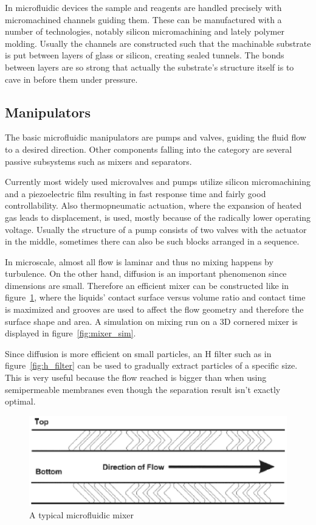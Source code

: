 \documentclass[12pt]{article}
\begin{document}
In microfluidic devices the sample and reagents are handled precisely with micromachined 
channels guiding them. These can be manufactured with a number of technologies, notably 
silicon micromachining and lately polymer molding. Usually the channels are constructed such that 
the machinable substrate is put between layers of glass or silicon, creating sealed tunnels.
The bonds between layers are so strong that actually the substrate's structure itself 
is to cave in before them under pressure.

\subsection{Manipulators}
The basic microfluidic manipulators are pumps and valves, guiding the fluid flow to a desired 
direction. Other components falling into the category are several passive subsystems such as
mixers and separators.

Currently most widely used microvalves and pumps utilize silicon micromachining and a 
piezoelectric film resulting in fast response time and fairly good controllability. Also 
thermopneumatic actuation, where the expansion of heated gas leads to displacement, is 
used, mostly because of the radically lower operating voltage. Usually the structure of a pump 
consists of two valves with the actuator in the middle, sometimes there can also be such 
blocks arranged in a sequence.

In microscale, almost all flow is laminar and thus no mixing happens by turbulence. On the other 
hand, diffusion is an important phenomenon since dimensions are small. Therefore an efficient 
mixer can be constructed like in figure~\ref{fig:mixer}, where the liquids' contact surface 
versus volume ratio and contact time is maximized and grooves are used to affect the flow geometry and therefore the surface shape and area. A simulation on mixing run on a 3D cornered 
mixer is displayed in figure~\ref{fig:mixer_sim}.

Since diffusion is more efficient on 
small particles, an H filter such as in figure~\ref{fig:h_filter} can be used to gradually
extract particles of a specific size. This is very useful because the flow reached is bigger
than when using semipermeable membranes even though the separation result isn't exactly optimal.

\begin{figure}[htcb]
\begin{center}
	\includegraphics{mixer2.eps}
	\caption{A typical microfluidic mixer \cite{HOWELL_2005}}
	\label{fig:mixer}
\end{center}
\end{figure}
\end{document}
